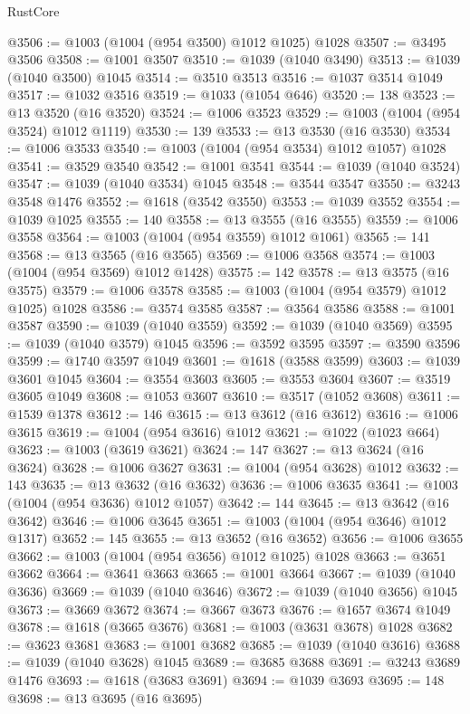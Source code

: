 \begin{lexlean}{RustCore}
\begin{coremodule}
@3506 := @1003 (@1004 (@954 @3500) @1012 @1025) @1028
@3507 := @3495 @3506
@3508 := @1001 @3507
@3510 := @1039 (@1040 @3490)
@3513 := @1039 (@1040 @3500) @1045
@3514 := @3510 @3513
@3516 := @1037 @3514 @1049
@3517 := @1032 @3516
@3519 := @1033 (@1054 @646)
@3520 := 138
@3523 := @13 @3520 (@16 @3520)
@3524 := @1006 @3523
@3529 := @1003 (@1004 (@954 @3524) @1012 @1119)
@3530 := 139
@3533 := @13 @3530 (@16 @3530)
@3534 := @1006 @3533
@3540 := @1003 (@1004 (@954 @3534) @1012 @1057) @1028
@3541 := @3529 @3540
@3542 := @1001 @3541
@3544 := @1039 (@1040 @3524)
@3547 := @1039 (@1040 @3534) @1045
@3548 := @3544 @3547
@3550 := @3243 @3548 @1476
@3552 := @1618 (@3542 @3550)
@3553 := @1039 @3552
@3554 := @1039 @1025
@3555 := 140
@3558 := @13 @3555 (@16 @3555)
@3559 := @1006 @3558
@3564 := @1003 (@1004 (@954 @3559) @1012 @1061)
@3565 := 141
@3568 := @13 @3565 (@16 @3565)
@3569 := @1006 @3568
@3574 := @1003 (@1004 (@954 @3569) @1012 @1428)
@3575 := 142
@3578 := @13 @3575 (@16 @3575)
@3579 := @1006 @3578
@3585 := @1003 (@1004 (@954 @3579) @1012 @1025) @1028
@3586 := @3574 @3585
@3587 := @3564 @3586
@3588 := @1001 @3587
@3590 := @1039 (@1040 @3559)
@3592 := @1039 (@1040 @3569)
@3595 := @1039 (@1040 @3579) @1045
@3596 := @3592 @3595
@3597 := @3590 @3596
@3599 := @1740 @3597 @1049
@3601 := @1618 (@3588 @3599)
@3603 := @1039 @3601 @1045
@3604 := @3554 @3603
@3605 := @3553 @3604
@3607 := @3519 @3605 @1049
@3608 := @1053 @3607
@3610 := @3517 (@1052 @3608)
@3611 := @1539 @1378
@3612 := 146
@3615 := @13 @3612 (@16 @3612)
@3616 := @1006 @3615
@3619 := @1004 (@954 @3616) @1012
@3621 := @1022 (@1023 @664)
@3623 := @1003 (@3619 @3621)
@3624 := 147
@3627 := @13 @3624 (@16 @3624)
@3628 := @1006 @3627
@3631 := @1004 (@954 @3628) @1012
@3632 := 143
@3635 := @13 @3632 (@16 @3632)
@3636 := @1006 @3635
@3641 := @1003 (@1004 (@954 @3636) @1012 @1057)
@3642 := 144
@3645 := @13 @3642 (@16 @3642)
@3646 := @1006 @3645
@3651 := @1003 (@1004 (@954 @3646) @1012 @1317)
@3652 := 145
@3655 := @13 @3652 (@16 @3652)
@3656 := @1006 @3655
@3662 := @1003 (@1004 (@954 @3656) @1012 @1025) @1028
@3663 := @3651 @3662
@3664 := @3641 @3663
@3665 := @1001 @3664
@3667 := @1039 (@1040 @3636)
@3669 := @1039 (@1040 @3646)
@3672 := @1039 (@1040 @3656) @1045
@3673 := @3669 @3672
@3674 := @3667 @3673
@3676 := @1657 @3674 @1049
@3678 := @1618 (@3665 @3676)
@3681 := @1003 (@3631 @3678) @1028
@3682 := @3623 @3681
@3683 := @1001 @3682
@3685 := @1039 (@1040 @3616)
@3688 := @1039 (@1040 @3628) @1045
@3689 := @3685 @3688
@3691 := @3243 @3689 @1476
@3693 := @1618 (@3683 @3691)
@3694 := @1039 @3693
@3695 := 148
@3698 := @13 @3695 (@16 @3695)

\end{coremodule}
\end{lexlean}
